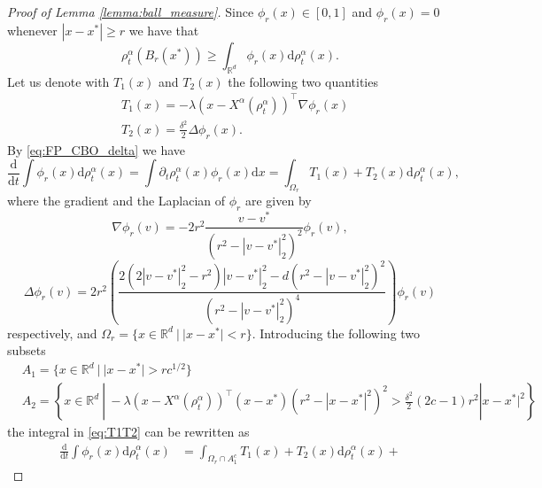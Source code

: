 \documentclass[reqno]{amsart}
\numberwithin{algorithm}{section}
\newcommand{\diff}{\mathrm{d}}
\newcommand{\R}{\mathbb{R}}
\newcommand{\Xalpha}{{X^\alpha}}
\begin{document}
{\begin{proof}[Proof of Lemma \ref{lemma:ball_measure}]
Since $\phi_r(x)\in[0,1]$ and $\phi_r(x)=0$ whenever $ |x-x^*|\geq r$ we have that 
$$\rho^\alpha_t(B_r(x^*)) \geq \int_{\mathbb{R}^d}\phi_r(x) \diff\rho^\alpha_t(x).$$
Let us denote with $T_1(x)$ and $T_2(x)$ the following two quantities
\begin{equation*}
    \begin{aligned}
        &T_1(x) = -\lambda(x-\Xalpha(\rho^\alpha_t))^\top\nabla\phi_r(x)\\
        &T_2(x) = \frac{\delta^2}{2}\Delta\phi_r(x).
    \end{aligned}
\end{equation*}
By \eqref{eq:FP_CBO_delta} we have 
\begin{equation}\label{eq:T1T2}
    \frac{\diff}{\diff t}\int\phi_r(x)\diff\rho^\alpha_t(x) = \int\partial_t\rho^\alpha_t(x)\phi_r(x)\diff x = \int_{\Omega_r} T_1(x)+T_2(x)\diff\rho^\alpha_t(x),
\end{equation}
where the gradient and the Laplacian of $\phi_r$ are given by 
    $$
\nabla \phi_r(v) = -2r^2 \frac{v - v^*}{\left( r^2 - |v - v^*|_2^2 \right)^2} \phi_r(v),
$$
$$
\Delta \phi_r(v) = 2r^2 \left( \frac{2 \left( 2|v - v^*|_2^2 - r^2 \right)|v - v^*|_2^2 - d \left( r^2 - |v - v^*|_2^2 \right)^2}{\left( r^2 - |v - v^*|_2^2 \right)^4} \right) \phi_r(v)
$$
respectively, and $\Omega_r= \{x\in\R^d\ |\  |x-x^*|<r\}$. Introducing the following two subsets 
\begin{equation*}
    \begin{aligned}
        &A_1 = \{x\in\R^d\ | \  |x-x^*|> rc^{1/2}\}\\
        &A_2 = \left\{x\in\R^d\ | \ -\lambda(x-\Xalpha(\rho^\alpha_t))^\top(x-x^*)\left(r^2- |x-x^*|^2\right)^2>\frac{\delta^2}{2}(2c-1)r^2 |x-x^*|^2\right\}
    \end{aligned}
\end{equation*}
the integral in \eqref{eq:T1T2} can be rewritten as
\begin{equation}\begin{aligned}
    \frac{\diff}{\diff t}\int\phi_r(x)\diff\rho^\alpha_t(x) &=
    \int_{\Omega_r\cap A_1^c} T_1(x)+T_2(x)\diff\rho^\alpha_t(x) +

\end{aligned}
\end{equation}
\end{proof}}
\end{document}
